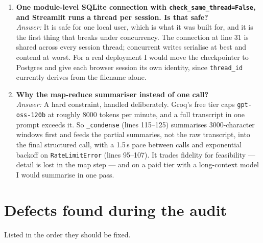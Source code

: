 \documentclass[11pt,a4paper]{article}
\begin{document}
\begin{enumerate}[leftmargin=*,itemsep=6pt]
\item \textbf{One module-level SQLite connection with
\texttt{check\_same\_thread=False}, and Streamlit runs a thread per session. Is
that safe?}\\
\emph{Answer:} It is safe for one local user, which is what it was built for, and
it is the first thing that breaks under concurrency. The connection at line 31 is
shared across every session thread; concurrent writes serialise at best and
contend at worst. For a real deployment I would move the checkpointer to Postgres
and give each browser session its own identity, since \texttt{thread\_id} currently
derives from the filename alone.

\item \textbf{Why the map-reduce summariser instead of one call?}\\
\emph{Answer:} A hard constraint, handled deliberately. Groq's free tier caps
\texttt{gpt-oss-120b} at roughly 8000 tokens per minute, and a full transcript in
one prompt exceeds it. So \texttt{\_condense} (lines 115--125) summarises
3000-character windows first and feeds the partial summaries, not the raw
transcript, into the final structured call, with a 1.5\,s pace between calls and
exponential backoff on \texttt{RateLimitError} (lines 95--107). It trades fidelity
for feasibility --- detail is lost in the map step --- and on a paid tier with a
long-context model I would summarise in one pass.

\end{enumerate}

\section{Defects found during the audit}\label{sec:defects}

Listed in the order they should be fixed.
\end{document}
